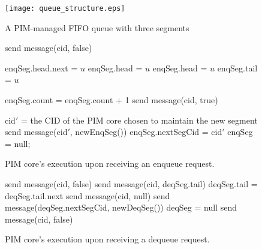 \documentclass[11pt]{article}
\begin{document}
\begin{figure}[ht!]
\centering
\texttt{[image: queue\_structure.eps]}
\caption{A PIM-managed FIFO queue with three segments}
\label{figure:queue_structure}
\end{figure}



\begin{figure}
\begin{algorithm}[H]
\Begin
{
    {
        send message(cid, false)\;
    }
    {
        {
            enqSeg.head.next = $u$\;
            enqSeg.head = $u$\;
        }
        {
            enqSeg.head = $u$\;
            enqSeg.tail = $u$\;
        }

        enqSeg.count = enqSeg.count + 1\;
        send message(cid, true)\;

        {
            cid$'$ = the CID of the PIM core chosen to maintain the new segment\;
            send message(cid$'$, newEnqSeg())\;
            enqSeg.nextSegCid = cid$'$\;
            enqSeg = null;
        }
    }
}
\end{algorithm}
\caption{PIM core's execution upon receiving an enqueue request.}
\label{figure:enq}
\end{figure}

\begin{figure}
\begin{algorithm}[H]
\Begin
{
    {
        send message(cid, false)\;
    }
    {
        {
			send message(cid, deqSeg.tail)\;
            deqSeg.tail = deqSeg.tail.next\;   
        }
        {
			{
				send message(cid, null)\;
			}
            {
                send message(deqSeg.nextSegCid, newDeqSeg())\;
                deqSeg = null\;
                send message(cid, false)\;
            }            
        }
    }
}
\end{algorithm}
\caption{PIM core's execution upon receiving a dequeue request.}
\label{figure:deq}
\end{figure}
\end{document}
